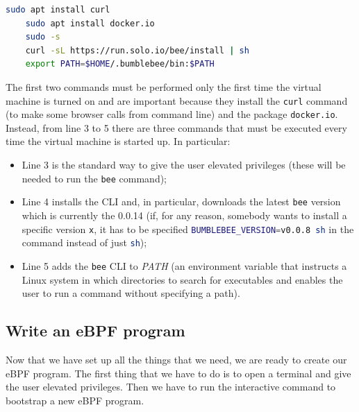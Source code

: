 \begin{lstlisting}[style=commandline, language=bash, caption={bee installation commands}]
	sudo apt install curl
	sudo apt install docker.io 
	sudo -s
	curl -sL https://run.solo.io/bee/install | sh 
	export PATH=$HOME/.bumblebee/bin:$PATH
\end{lstlisting}

The first two commands must be performed only the first time the virtual machine is turned on and are important because they install the \colorbox{backcolour}{\lstinline[style=highlight, language=bash]|curl|} command (to make some browser calls from command line) and the package \colorbox{backcolour}{\lstinline[style=highlight, language=bash]|docker.io|}.
Instead, from line 3 to 5 there are three commands that must be executed every time the virtual machine is started up.
In particular:

\begin{itemize}
	\item 
		Line 3 is the standard way to give the user elevated privileges (these will be needed to run the \colorbox{backcolour}{\lstinline[style=highlight, language=bash]|bee|} command);
	\item 
		Line 4 installs the CLI and, in particular, downloads the latest \colorbox{backcolour}{\lstinline[style=highlight, language=bash]|bee|} version which is currently the 0.0.14 (if, for any reason, somebody wants to install a specific version \colorbox{backcolour}{\lstinline[style=highlight, language=bash]|x|}, it has to be specified \colorbox{backcolour}{\lstinline[style=highlight, language=bash]|BUMBLEBEE_VERSION=v0.0.8 sh|} in the command instead of just \colorbox{backcolour}{\lstinline[style=highlight, language=bash]|sh|});
	\item 
		Line 5 adds the \colorbox{backcolour}{\lstinline[style=highlight, language=bash]|bee|} CLI to \textit{PATH} (an environment variable that instructs a Linux system in which directories to search for executables and enables the user to run a command without specifying a path).
\end{itemize}

\subsection{Write an eBPF program}

Now that we have set up all the things that we need, we are ready to create our eBPF program.
The first thing that we have to do is to open a terminal and give the user elevated privileges.
Then we have to run the interactive command to bootstrap a new eBPF program.

